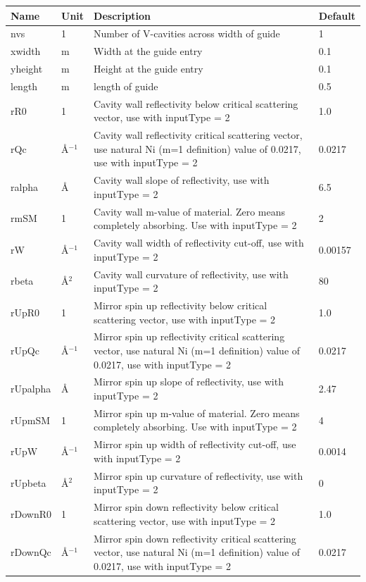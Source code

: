\begin{longtable}{p{}p{}p{}p{}}
\toprule
\textbf{Name} & \textbf{Unit} & \textbf{Description} & \textbf{Default} \\
\midrule
\endhead
nvs & 1 & Number of V-cavities across width of guide & 1 \\
xwidth & m & Width at the guide entry & 0.1 \\
yheight & m & Height at the guide entry & 0.1 \\
length & m & length of guide & 0.5 \\
rR0 & 1 & Cavity wall reflectivity below critical scattering vector, use with inputType = 2 & 1.0 \\
rQc & \AA{}$^{-1}$ & Cavity wall reflectivity critical scattering vector, use natural Ni (m=1 definition) value of 0.0217, use with inputType = 2 & 0.0217 \\
ralpha & \AA{} & Cavity wall slope of reflectivity, use with inputType = 2 & 6.5 \\
rmSM & 1 & Cavity wall m-value of material. Zero means completely absorbing. Use with inputType = 2 & 2 \\
rW & \AA{}$^{-1}$ & Cavity wall width of reflectivity cut-off, use with inputType = 2 & 0.00157 \\
rbeta & \AA{}$^{2}$ & Cavity wall curvature of reflectivity, use with inputType = 2 & 80 \\
rUpR0 & 1 & Mirror spin up reflectivity below critical scattering vector, use with inputType = 2 & 1.0 \\
rUpQc & \AA{}$^{-1}$ & Mirror spin up reflectivity critical scattering vector, use natural Ni (m=1 definition) value of 0.0217, use with inputType = 2 & 0.0217 \\
rUpalpha & \AA{} & Mirror spin up slope of reflectivity, use with inputType = 2 & 2.47 \\
rUpmSM & 1 & Mirror spin up m-value of material. Zero means completely absorbing. Use with inputType = 2 & 4 \\
rUpW & \AA{}$^{-1}$ & Mirror spin up width of reflectivity cut-off, use with inputType = 2 & 0.0014 \\
rUpbeta & \AA{}$^{2}$ & Mirror spin up curvature of reflectivity, use with inputType = 2 & 0 \\
rDownR0 & 1 & Mirror spin down reflectivity below critical scattering vector, use with inputType = 2 & 1.0 \\
rDownQc & \AA{}$^{-1}$ & Mirror spin down reflectivity critical scattering vector, use natural Ni (m=1 definition) value of 0.0217, use with inputType = 2 & 0.0217 \\

\end{longtable}
